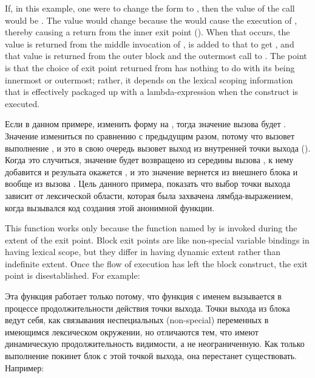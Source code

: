 If, in this example, one were to change the form  to
, then the value of the call 
would be .  The value would change because the  would cause the
execution of , thereby causing
a return from the inner exit point ().
When that occurs, the value  is returned from the
middle invocation of ,  is added to that
to get , and that value is returned from the outer block
and the outermost call to .  The point
is that the choice of exit point returned from has nothing to do with its
being innermost or outermost; rather,
it depends on the lexical scoping information
that is effectively packaged up with a lambda-expression when the
 construct is executed.

Если в данном примере, изменить форму  на ,
тогда значение вызова  будет . Значение
измениться по сравнению с предыдущим разом, потому что  вызовет
выполнение , и это в свою очередь вызовет выход
из внутренней точки выхода ().
Когда это случиться, значение  будет возвращено из середины вызова
, к нему добавится  и резульата окажется , и это
значение вернется из внешнего блока и вообще из вызова
. Цель данного примера, показать что выбор точки выхода
зависит от лексической области, которая была 
захвачена лямбда-выражением, когда вызывался код создания этой анонимной функции.

This function  works only because the
function named by  is invoked during the extent of the exit point.
Block exit points are like non-special variable bindings in having
lexical scope, but they differ in having dynamic extent rather than indefinite
extent.  Once the flow of execution has left the block construct,
the exit point is disestablished.  For example:

Эта функция  работает только потому, что функция с именем
 вызывается в процессе продолжительности действия точки выхода.
Точки выхода из блока ведут себя, как связывания неспециальных (non-special)
переменных в имеющимся лексическом окружении, но отличаются тем, что имеют
динамическую продолжительность видимости, а не неограниченную. Как только
выполнение покинет блок с этой точкой выхода, она перестанет
существовать. Например: 

